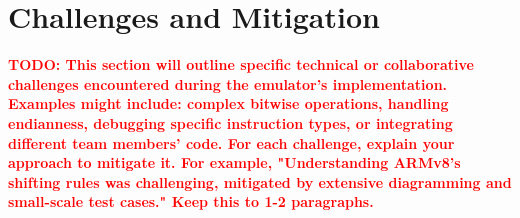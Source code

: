 \documentclass[11pt,a4paper]{article} %
\newcommand{\todo}[1]{\textcolor{red}{\textbf{TODO: #1}}}
\begin{document}
\section{Challenges and Mitigation}
\label{sec:challenges}
\todo{This section will outline specific technical or collaborative challenges encountered during the emulator's implementation. Examples might include: complex bitwise operations, handling endianness, debugging specific instruction types, or integrating different team members' code. For each challenge, explain your approach to mitigate it. For example, "Understanding ARMv8's shifting rules was challenging, mitigated by extensive diagramming and small-scale test cases." Keep this to 1-2 paragraphs.}
\end{document}

